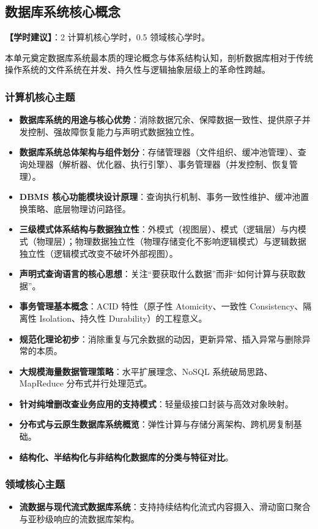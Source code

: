 \subsection{数据库系统核心概念}
\textbf{【学时建议】}：2 计算机核心学时，0.5 领域核心学时。

本单元奠定数据库系统最本质的理论概念与体系结构认知，剖析数据库相对于传统操作系统的文件系统在并发、持久性与逻辑抽象层级上的革命性跨越。

\subsubsection{计算机核心主题}
\begin{itemize}
    \item \textbf{数据库系统的用途与核心优势}：消除数据冗余、保障数据一致性、提供原子并发控制、强故障恢复能力与声明式数据独立性。
    \item \textbf{数据库系统总体架构与组件划分}：存储管理器（文件组织、缓冲池管理）、查询处理器（解析器、优化器、执行引擎）、事务管理器（并发控制、恢复管理）。
    \item \textbf{DBMS 核心功能模块设计原理}：查询执行机制、事务一致性维护、缓冲池置换策略、底层物理访问路径。
    \item \textbf{三级模式体系结构与数据独立性}：外模式（视图层）、模式（逻辑层）与内模式（物理层）；物理数据独立性（物理存储变化不影响逻辑模式）与逻辑数据独立性（逻辑模式改变不破坏外部视图）。
    \item \textbf{声明式查询语言的核心思想}：关注“要获取什么数据”而非“如何计算与获取数据”。
    \item \textbf{事务管理基本概念}：ACID 特性（原子性 Atomicity、一致性 Consistency、隔离性 Isolation、持久性 Durability）的工程意义。
    \item \textbf{规范化理论初步}：消除重复与冗余数据的动因，更新异常、插入异常与删除异常的本质。
    \item \textbf{大规模海量数据管理策略}：水平扩展理念、NoSQL 系统破局思路、MapReduce 分布式并行处理范式。
    \item \textbf{针对纯增删改查业务应用的支持模式}：轻量级接口封装与高效对象映射。
    \item \textbf{分布式与云原生数据库系统概览}：弹性计算与存储分离架构、跨机房复制基础。
    \item \textbf{结构化、半结构化与非结构化数据库的分类与特征对比}。
\end{itemize}

\subsubsection{领域核心主题}
\begin{itemize}
    \item \textbf{流数据与现代流式数据库系统}：支持持续结构化流式内容摄入、滑动窗口聚合与亚秒级响应的流数据库架构。
\end{itemize}

